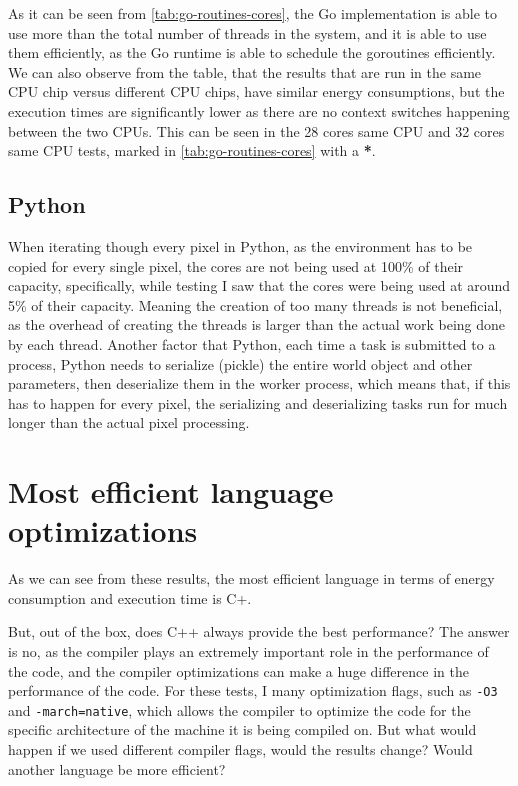 

As it can be seen from \autoref{tab:go-routines-cores}, the Go implementation is able to use more than the total number of threads in the system, and it is able to use them efficiently, as the Go runtime is able to schedule the goroutines efficiently. We can also observe from the table, that the results that are run in the same CPU chip versus different CPU chips, have similar energy consumptions, but the execution times are significantly lower as there are no context switches happening between the two CPUs. This can be seen in the 28 cores same CPU and 32 cores same CPU tests, marked in \autoref{tab:go-routines-cores} with a \textbf{*}.

\subsection{Python}
When iterating though every pixel in Python, as the environment has to be copied for every single pixel, the cores are not being used at 100\% of their capacity, specifically, while testing I saw that the cores were being used at around 5\% of their capacity. Meaning the creation of too many threads is not beneficial, as the overhead of creating the threads is larger than the actual work being done by each thread. 
Another factor that Python, each time a task is submitted to a process, Python needs to serialize (pickle) the entire world object and other parameters, then deserialize them in the worker process, which means that, if this has to happen for every pixel, the serializing and deserializing tasks run for much longer than the actual pixel processing.

\section{Most efficient language optimizations}
As we can see from these results, the most efficient language in terms of energy consumption and execution time is C\++. 

But, out of the box, does C++ always provide the best performance? The answer is no, as the compiler plays an extremely important role in the performance of the code, and the compiler optimizations can make a huge difference in the performance of the code.
For these tests, I many optimization flags, such as \texttt{-O3} and \texttt{-march=native}, which allows the compiler to optimize the code for the specific architecture of the machine it is being compiled on. But what would happen if we used different compiler flags, would the results change? Would another language be more efficient?

